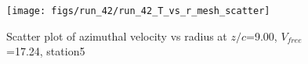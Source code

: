 \begin{figure}[H]
\centering
\texttt{[image: figs/run\_42/run\_42\_T\_vs\_r\_mesh\_scatter]}
\caption{Scatter plot of azimuthal velocity vs radius at $z/c$=9.00, $V_{free}$=17.24, station5}
\label{fig:run_42_T_vs_r_mesh_scatter}
\end{figure}


